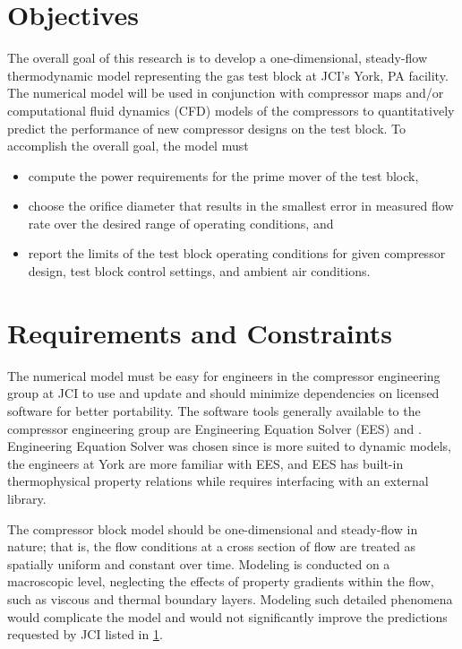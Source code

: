 \section{Objectives} \label{sec:objective}
The overall goal of this research is to develop a one-dimensional, steady-flow thermodynamic model 
representing the  gas test block at JCI's York, PA facility. 
The numerical model will be used in conjunction with compressor maps and/or computational fluid dynamics (CFD)%
models of the compressors to quantitatively predict the performance of new compressor designs on the test block. 
To accomplish the overall goal, the model must
\begin{itemize}
  \item compute the power requirements for the prime mover of the test block,
  \item choose the orifice diameter that results in the smallest error in measured
    flow rate over the desired range of operating conditions, and 
  \item report the limits of the test block operating conditions for given compressor 
		design, test block control settings, and ambient air conditions.
\end{itemize}

\section{Requirements and Constraints} \label{sec:requirements}
The numerical model must be easy for engineers in the compressor engineering group at JCI 
to use and update and should minimize dependencies on licensed software for better portability. 
The software tools generally available to the compressor engineering group are 
Engineering Equation Solver (EES) and \MLS{}. 
Engineering Equation Solver was chosen since \MLS{} is more suited to dynamic models, 
the engineers at York are more familiar with EES, 
and EES has built-in thermophysical property relations 
while \MLS{} requires interfacing with an external library.

The compressor block model should be one-dimensional and steady-flow in nature; 
that is, the flow conditions at a cross section of flow 
are treated as spatially uniform and constant over time. 
Modeling is conducted on a macroscopic level, 
neglecting the effects of property gradients within the flow, 
such as viscous and thermal boundary layers. 
Modeling such detailed phenomena would complicate the model 
and would not significantly improve the predictions requested by JCI listed in \cref{sec:objective}.

